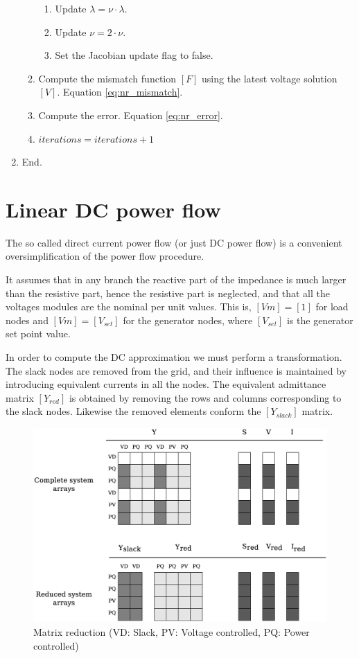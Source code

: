 \documentclass[nols,a4paper,twoside,notoc,fleqn]{tufte-book}
\begin{document}
\begin{enumerate}
\begin{enumerate}
\begin{enumerate}
		\item Update $\lambda = \nu \cdot \lambda$.
		
		\item Update $\nu = 2 \cdot \nu$.
		
		\item Set the Jacobian update flag to false.
		\end{enumerate}
	
	\item Compute the mismatch function $[F]$ using the latest voltage solution $[V]$. Equation \ref{eq:nr_mismatch}.
	
	\item Compute the error. Equation \ref{eq:nr_error}.
	
	\item $iterations = iterations + 1$
	\end{enumerate}

\item End.
\end{enumerate}

\section{Linear DC power flow}
The so called direct current power flow (or just DC power flow) is a convenient oversimplification of the power flow procedure.

It assumes that in any branch the reactive part of the impedance is much larger than the resistive part, hence the resistive part is neglected, and that all the voltages modules are the nominal per unit values. This is, $[Vm]=[1]$ for load nodes and $[Vm]=[V_{set}]$ for the generator nodes, where $[V_{set}]$ is the generator set point value.

In order to compute the DC approximation we must perform a transformation. The slack nodes are removed from the grid, and their influence is maintained by introducing equivalent currents in all the nodes. The equivalent admittance matrix $[{Y}_{red}]$ is obtained by removing the rows and columns corresponding to the slack nodes. Likewise the removed elements conform the $[{Y}_{slack}]$ matrix.

\begin{figure}[h!]
	\centering
	\includegraphics[width=0.85\linewidth]{img/Matrix_reduction.eps}
	\caption{Matrix reduction (VD: Slack, PV: Voltage controlled, PQ: Power controlled)}
	\label{fig:Matrix_reduction}
\end{figure}
\end{document}
